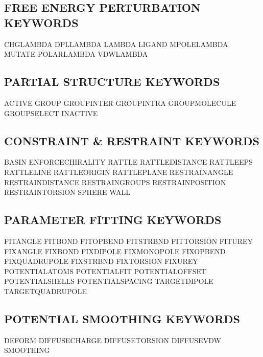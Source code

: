 \documentclass[letterpaper,11pt,english]{sphinxmanual}
\begin{document}
\subsection{FREE ENERGY PERTURBATION KEYWORDS}
\label{\detokenize{text/keywords:free-energy-perturbation-keywords}}
CHG\sphinxhyphen{}LAMBDA      DPL\sphinxhyphen{}LAMBDA      LAMBDA
LIGAND  MPOLE\sphinxhyphen{}LAMBDA    MUTATE
POLAR\sphinxhyphen{}LAMBDA    VDW\sphinxhyphen{}LAMBDA


\subsection{PARTIAL STRUCTURE KEYWORDS}
\label{\detokenize{text/keywords:partial-structure-keywords}}
ACTIVE  GROUP   GROUP\sphinxhyphen{}INTER
GROUP\sphinxhyphen{}INTRA     GROUP\sphinxhyphen{}MOLECULE  GROUP\sphinxhyphen{}SELECT
INACTIVE


\subsection{CONSTRAINT \& RESTRAINT KEYWORDS}
\label{\detokenize{text/keywords:constraint-restraint-keywords}}
BASIN   ENFORCE\sphinxhyphen{}CHIRALITY       RATTLE
RATTLE\sphinxhyphen{}DISTANCE RATTLE\sphinxhyphen{}EPS      RATTLE\sphinxhyphen{}LINE
RATTLE\sphinxhyphen{}ORIGIN   RATTLE\sphinxhyphen{}PLANE    RESTRAIN\sphinxhyphen{}ANGLE
RESTRAIN\sphinxhyphen{}DISTANCE       RESTRAIN\sphinxhyphen{}GROUPS RESTRAIN\sphinxhyphen{}POSITION
RESTRAIN\sphinxhyphen{}TORSION        SPHERE  WALL


\subsection{PARAMETER FITTING KEYWORDS}
\label{\detokenize{text/keywords:parameter-fitting-keywords}}
FIT\sphinxhyphen{}ANGLE       FIT\sphinxhyphen{}BOND        FIT\sphinxhyphen{}OPBEND
FIT\sphinxhyphen{}STRBND      FIT\sphinxhyphen{}TORSION     FIT\sphinxhyphen{}UREY
FIX\sphinxhyphen{}ANGLE       FIX\sphinxhyphen{}BOND        FIX\sphinxhyphen{}DIPOLE
FIX\sphinxhyphen{}MONOPOLE    FIX\sphinxhyphen{}OPBEND      FIX\sphinxhyphen{}QUADRUPOLE
FIX\sphinxhyphen{}STRBND      FIX\sphinxhyphen{}TORSION     FIX\sphinxhyphen{}UREY
POTENTIAL\sphinxhyphen{}ATOMS POTENTIAL\sphinxhyphen{}FIT   POTENTIAL\sphinxhyphen{}OFFSET
POTENTIAL\sphinxhyphen{}SHELLS        POTENTIAL\sphinxhyphen{}SPACING       TARGET\sphinxhyphen{}DIPOLE
TARGET\sphinxhyphen{}QUADRUPOLE


\subsection{POTENTIAL SMOOTHING KEYWORDS}
\label{\detokenize{text/keywords:potential-smoothing-keywords}}
DEFORM  DIFFUSE\sphinxhyphen{}CHARGE  DIFFUSE\sphinxhyphen{}TORSION
DIFFUSE\sphinxhyphen{}VDW     SMOOTHING
\end{document}
